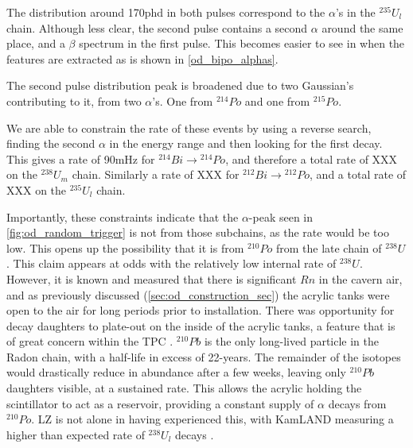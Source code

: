 

\par
The distribution around 170phd in both pulses correspond to the $\alpha$'s in the ${}^{235}U_{l}$ chain.
Although less clear, the second pulse contains a second $\alpha$ around the same place, and a $\beta$ spectrum in the first pulse.
This becomes easier to see in when the features are extracted as is shown in \autoref{od_bipo_alphas}.



\par
The second pulse distribution peak is broadened due to two Gaussian's contributing to it, from two $\alpha$'s.
One from ${}^{214}Po$ and one from ${}^{215}Po$.

We are able to constrain the rate of these events by using a reverse search, finding the second $\alpha$ in the energy range and then looking for the first decay.
This gives a rate of 90mHz for ${}^{214}Bi \to {}^{214}Po$, and therefore a total rate of XXX on the ${}^{238}U_{m}$ chain.
Similarly a rate of XXX for ${}^{212}Bi \to {}^{212}Po$, and a total rate of XXX on the ${}^{235}U_{l}$ chain.


\par
Importantly, these constraints indicate that the $\alpha$-peak seen in \autoref{fig:od_random_trigger} is not from those subchains, as the rate would be too low.
This opens up the possibility that it is from ${}^{210}Po$ from the late chain of ${}^{238}U$.
This claim appears at odds with the relatively low internal rate of ${}^{238}U$.
However, it is known and measured that there is significant $Rn$ in the cavern air, and as previously discussed (\autoref{sec:od_construction_sec}) the acrylic tanks were open to the air for long periods prior to installation.
There was opportunity for decay daughters to plate-out on the inside of the acrylic tanks, a feature that is of great concern within the TPC \cite{radon_plateout_ref}.
${}^{210}Pb$ is the only long-lived particle in the Radon chain, with a half-life in excess of 22-years. 
The remainder of the isotopes would drastically reduce in abundance after a few weeks, leaving only ${}^{210}Pb$ daughters visible, at a sustained rate.
This allows the acrylic holding the scintillator to act as a reservoir, providing a constant supply of $\alpha$ decays from ${}^{210}Po$.
LZ is not alone in having experienced this, with KamLAND measuring a higher than expected rate of ${}^{238}U_l$ decays \cite{KamLAND_LS_contaminants_ref}.

